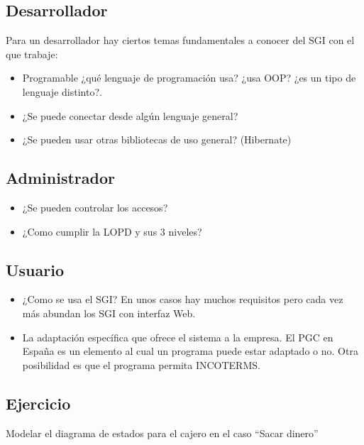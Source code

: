 \documentclass[letterpaper,10pt,spanish]{sphinxmanual}
\begin{document}
\subsection{Desarrollador}
\label{tema8:desarrollador}
Para un desarrollador hay ciertos temas fundamentales a conocer del SGI con el que trabaje:
\begin{itemize}
\item {} 
Programable ¿qué lenguaje de programación usa? ¿usa OOP? ¿es un tipo de lenguaje distinto?.

\item {} 
¿Se puede conectar desde algún lenguaje general?

\item {} 
¿Se pueden usar otras bibliotecas de uso general? (Hibernate)

\end{itemize}


\subsection{Administrador}
\label{tema8:administrador}\begin{itemize}
\item {} 
¿Se pueden controlar  los accesos?

\item {} 
¿Como cumplir la LOPD y sus 3 niveles?

\end{itemize}


\subsection{Usuario}
\label{tema8:usuario}\begin{itemize}
\item {} 
¿Como se usa el SGI? En unos casos hay muchos requisitos pero cada vez más abundan los SGI con interfaz Web.

\item {} 
La adaptación específica que ofrece el sistema a la empresa. El PGC en España es un elemento al cual un programa puede estar adaptado o no. Otra posibilidad es que el programa permita INCOTERMS.

\end{itemize}


\subsection{Ejercicio}
\label{tema8:ejercicio}
Modelar el diagrama de estados para el cajero en el caso ``Sacar dinero''
\end{document}

